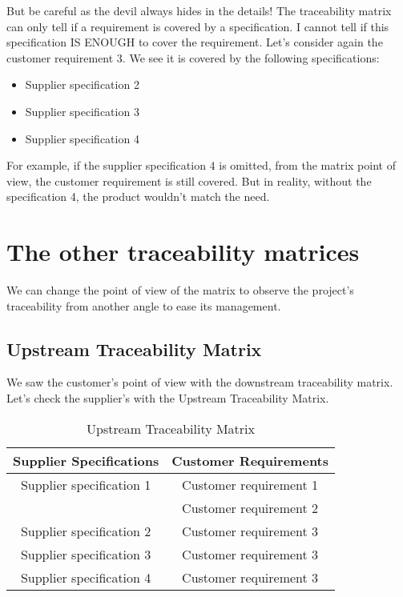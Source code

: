 But be careful as the devil always hides in the details! The traceability matrix can only tell if a requirement is covered by a specification. I cannot tell if this specification IS ENOUGH to cover the requirement.
Let’s consider again the customer requirement 3. We see it is covered by the following specifications:

\begin{itemize}
    \item Supplier specification 2
    \item Supplier specification 3
    \item Supplier specification 4
\end{itemize}

For example, if the supplier specification 4 is omitted, from the matrix point of view, the customer requirement is still covered. But in reality, without the specification 4, the product wouldn’t match the need.

\section{The other traceability matrices}
We can change the point of view of the matrix to observe the project’s traceability from another angle to ease its management.

\subsection{Upstream Traceability Matrix}
We saw the customer’s point of view with the downstream traceability matrix. Let’s check the supplier’s with the Upstream Traceability Matrix.

\begin{table*}
	\centering
		\begin{tabular}{|c|c|}
			\hline
			\textbf{Supplier Specifications} & \textbf{Customer Requirements}\\
            \hline
            Supplier specification 1 & Customer requirement 1\\
            & Customer requirement 2\\
            \hline
            Supplier specification 2 & Customer requirement 3\\
            \hline
            Supplier specification 3 & Customer requirement 3\\
            \hline
            Supplier specification 4 & Customer requirement 3\\
            \hline
		\end{tabular}
	\caption{Upstream Traceability Matrix}
	\label{tab:UpstreamTraceabilityMatrix}
\end{table*}

